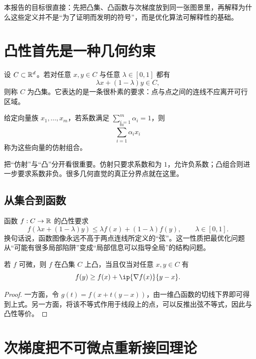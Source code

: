 \documentclass[11pt]{article}
\begin{document}
\MakeCourseReportTitle

\begin{SummaryBox}
本报告的目标很直接：先把凸集、凸函数与次梯度放到同一张图景里，再解释为什么这些定义并不是“为了证明而发明的符号”，而是优化算法可解释性的基础。
\end{SummaryBox}

\section{凸性首先是一种几何约束}

设 $C \subset \mathbb{R}^d$。若对任意 $x,y \in C$ 与任意 $\lambda \in [0,1]$ 都有
\[
\lambda x + (1-\lambda)y \in C,
\]
则称 $C$ 为凸集。它表达的是一条很朴素的要求：点与点之间的连线不应离开可行区域。

\begin{definition}[仿射组合]
给定向量族 $x_1,\dots,x_m$，若系数满足 $\sum_{i=1}^m \alpha_i = 1$，则
\[
\sum_{i=1}^m \alpha_i x_i
\]
称为这些向量的仿射组合。
\end{definition}

\begin{AnalysisBox}
把“仿射”与“凸”分开看很重要。仿射只要求系数和为 $1$，允许负系数；凸组合则进一步要求系数非负。很多几何直觉的真正分界点就在这里。
\end{AnalysisBox}

\subsection{从集合到函数}

函数 $f:C\to \mathbb{R}$ 的凸性要求
\[
f(\lambda x+(1-\lambda)y) \le \lambda f(x)+(1-\lambda)f(y), \qquad \lambda\in[0,1].
\]
换句话说，函数图像永远不高于两点连线所定义的“弦”。这一性质把最优化问题从“可能有很多局部陷阱”变成“局部信息可以指导全局”的结构问题。

\begin{proposition}[一阶判别]
若 $f$ 可微，则 $f$ 在凸集 $C$ 上凸，当且仅当对任意 $x,y\in C$ 有
\[
f(y)\ge f(x) + \ip{\nabla f(x)}{y-x}.
\]
\end{proposition}

\begin{proof}
一方面，令 $g(t)=f(x+t(y-x))$，由一维凸函数的切线下界即可得到上式。另一方面，将该不等式作用于线段上的点，可以反推出弦不等式，因此与凸性等价。
\end{proof}

\section{次梯度把不可微点重新接回理论}
\end{document}

